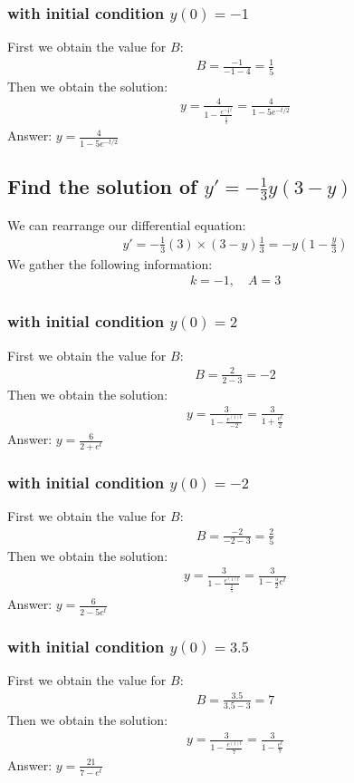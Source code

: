 \documentclass{article}
\begin{document}
\subsubsection{with initial condition $y(0) = -1$}
First we obtain the value for $B$:
\begin{align*}
	B = \frac{-1}{-1 - 4} = \frac{1}{5}
\end{align*}
Then we obtain the solution:
\begin{align*}
	y = \frac{4}{1 - \frac{e^{-\frac{1}{2}t}}{\frac{1}{5}}} = \frac{4}{1 - 5e^{-t/2}}
\end{align*}
Answer: $y = \frac{4}{1 - 5e^{-t/2}}$

\subsection{Find the solution of $y' = - \frac{1}{3}y(3 - y)$}
We can rearrange our differential equation:
\begin{align*}
	y' = -\frac{1}{3}(3) \times (3 - y)\frac{1}{3} = -y(1 - \frac{y}{3})
\end{align*}
We gather the following information:
\begin{align*}
	k = -1, \quad A = 3
\end{align*}
\subsubsection{with initial condition $y(0) = 2$}
First we obtain the value for $B$:
\begin{align*}
	B = \frac{2}{2 - 3} = -2
\end{align*}
Then we obtain the solution:
\begin{align*}
	y = \frac{3}{1 - \frac{e^{(1)t}}{-2}} = \frac{3}{1 + \frac{e^{t}}{2}}
\end{align*}
Answer: $y = \frac{6}{2 + e^t}$
\subsubsection{with initial condition $y(0) = -2$}
First we obtain the value for $B$:
\begin{align*}
	B = \frac{-2}{-2 - 3} = \frac{2}{5}
\end{align*}
Then we obtain the solution:
\begin{align*}
	y = \frac{3}{1 - \frac{e^{(1)t}}{\frac{2}{5}}} = \frac{3}{1 - \frac{5}{2}e^{t}}
\end{align*}
Answer: $y = \frac{6}{2 - 5e^t}$
\subsubsection{with initial condition $y(0) = 3.5$}
First we obtain the value for $B$:
\begin{align*}
	B = \frac{3.5}{3.5 - 3} = 7
\end{align*}
Then we obtain the solution:
\begin{align*}
	y = \frac{3}{1 - \frac{e^{(1)t}}{7}} = \frac{3}{1 - \frac{e^{t}}{7}}
\end{align*}
Answer: $y = \frac{21}{7 - e^t}$
\end{document}
